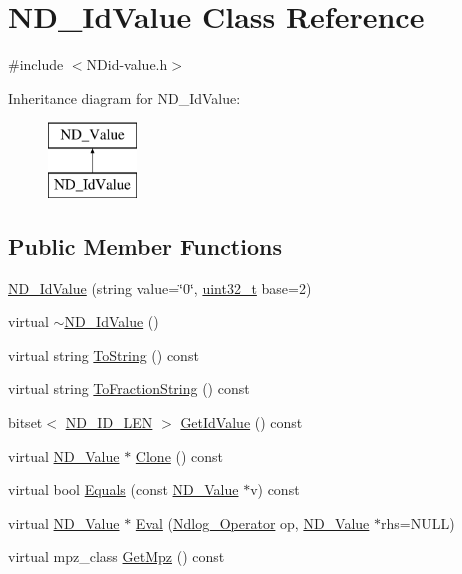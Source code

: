 \hypertarget{class_n_d___id_value}{\section{N\-D\-\_\-\-Id\-Value Class Reference}
\label{class_n_d___id_value}
}


{\ttfamily \#include $<$N\-Did-\/value.\-h$>$}

Inheritance diagram for N\-D\-\_\-\-Id\-Value\-:\begin{figure}[H]
\begin{center}
\leavevmode
\includegraphics[height=2.000000cm]{class_n_d___id_value}
\end{center}
\end{figure}
\subsection*{Public Member Functions}
\begin{DoxyCompactItemize}
\item 
\hyperlink{class_n_d___id_value_a6acf6aaf6cfec7f4f6e418ef73b850ee}{N\-D\-\_\-\-Id\-Value} (string value=\char`\"{}0\char`\"{}, \hyperlink{msus_2webserver_2uthash_8h_a435d1572bf3f880d55459d9805097f62}{uint32\-\_\-t} base=2)
\item 
virtual \hyperlink{class_n_d___id_value_a44e9464755e0eb6c73abd2554b7df7e0}{$\sim$\-N\-D\-\_\-\-Id\-Value} ()
\item 
virtual string \hyperlink{class_n_d___id_value_a98248b82fef11b5ffe11aa20f7af2827}{To\-String} () const 
\item 
virtual string \hyperlink{class_n_d___id_value_a794298528c007b346153c916d8cf2120}{To\-Fraction\-String} () const 
\item 
bitset$<$ \hyperlink{_n_did-value_8h_ae013c4e072a3fc8640f771f3e4c0e4b6}{N\-D\-\_\-\-I\-D\-\_\-\-L\-E\-N} $>$ \hyperlink{class_n_d___id_value_ac789156bc60739fb91752457c3ca3584}{Get\-Id\-Value} () const 
\item 
virtual \hyperlink{class_n_d___value}{N\-D\-\_\-\-Value} $\ast$ \hyperlink{class_n_d___id_value_adc3e53144381e763eb84e8f6d2dcf3e9}{Clone} () const 
\item 
virtual bool \hyperlink{class_n_d___id_value_aa84829bbfe9842c08a9d011009bf6ad3}{Equals} (const \hyperlink{class_n_d___value}{N\-D\-\_\-\-Value} $\ast$v) const 
\item 
virtual \hyperlink{class_n_d___value}{N\-D\-\_\-\-Value} $\ast$ \hyperlink{class_n_d___id_value_ade36f0cd7fcb88af1e0e1794d3f4afea}{Eval} (\hyperlink{_n_dvalue_8h_afc938fb729c95de25b4d2eb18640b303}{Ndlog\-\_\-\-Operator} op, \hyperlink{class_n_d___value}{N\-D\-\_\-\-Value} $\ast$rhs=N\-U\-L\-L)
\item 
virtual mpz\-\_\-class \hyperlink{class_n_d___id_value_aff71796116425894904e79070a87669d}{Get\-Mpz} () const 
\end{DoxyCompactItemize}
